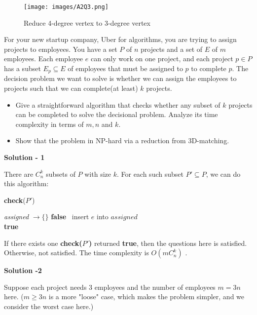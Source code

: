 \documentclass{article}
\newcounter{exercise}
\newcommand{\<}{
    \langle}
\renewcommand{\>}{
    \rangle}
\begin{document}
{\begin{figure}[htp]
    \centering
    \texttt{[image: images/A2Q3.png]}
    \caption{Reduce 4-degree vertex to 3-degree vertex}
\end{figure}


\begin{exercise}
For your new startup company, Uber for algorithms, you are trying to assign projects to employees. You have a set $P$ of $n$ projects and a set of $E$ of $m$ employees. Each employee $e$ can only work on one project, and each project $p\in P$ has a subset $E_p\subseteq E$ of employees that must be assigned to $p$ to complete $p$. The decision problem we want to solve is whether we can assign the employees to projects such that we can complete(at least) $k$ projects.
\begin{itemize}
\item Give a straightforward algorithm that checks whether any subset of $k$ projects can be completed to solve the decisional problem. Analyze its time complexity in terms of $m,n$ and $k$.
\item Show that the problem in NP-hard via a reduction from 3D-matching.
\end{itemize}
\end{exercise}

\bigskip
\noindent \textbf{Solution - 1}

There are $C_{n}^{k}$ subsets of $P$ with size $k$. For each such subset $P' \subseteq P$, we can do this algorithm:

\begin{algorithm}[htb]
\caption{\textbf{check}($P'$)}
\begin{algorithmic}[1]
\State \textit{assigned} $\rightarrow \{\}$
            \Return \textbf{false}
        \Else
            \ insert $e$ into $assigned$
        \EndIf
    \EndFor
\EndFor \\
\Return \textbf{true}
\end{algorithmic}
\end{algorithm}

If there exists one \textbf{check($P'$)} returned \textbf{true}, then the questions here is satisfied. Otherwise, not satisfied. The time complexity is $O(mC_{n}^{k})$ .

\newpage
\noindent \textbf{Solution -2}

Suppose each project needs 3 employees and the number of employees $m=3n$ here. ($m \ge 3n$ is a more "loose" case, which makes the problem simpler, and we consider the worst case here.)

}
\end{document}
